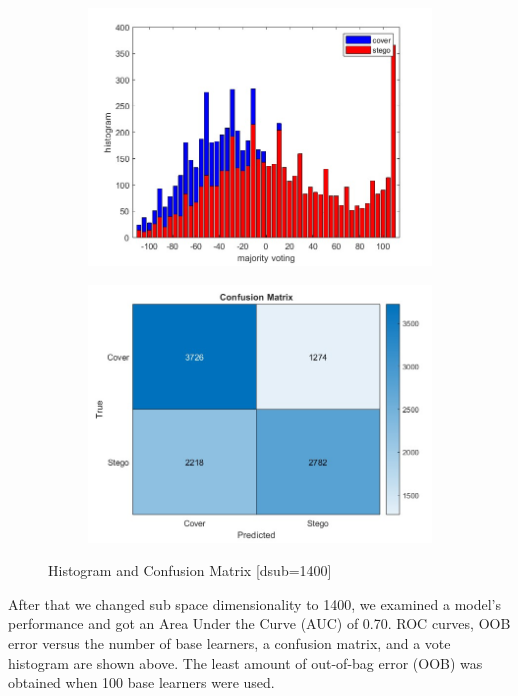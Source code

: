 \begin{figure}[H]
    \begin{subfigure}[b]{0.5\textwidth}
        \includegraphics[width=\textwidth]{img/1400/gray1400histo.jpg}
    \end{subfigure}
    \hfill
    \begin{subfigure}[b]{0.5\textwidth}
        \includegraphics[width=\textwidth]{img/1400/gray1400confuse.jpg}
    \end{subfigure}
    \caption{Histogram and Confusion Matrix [dsub=1400]}
\end{figure}
\begin{flushleft}
After that we changed sub space dimensionality to 1400, we examined a model's performance and got an Area Under the Curve (AUC) of 0.70. ROC curves, OOB error versus the number of base learners, a confusion matrix, and a vote histogram are shown above. The least amount of out-of-bag error (OOB) was obtained when 100 base learners were used.
\end{flushleft}
